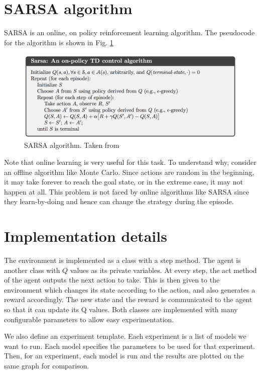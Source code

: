\documentclass{article}
\begin{document}
\section{SARSA algorithm} \label{sarsa_alg}

SARSA is an online, on policy reinforcement learning algorithm. The pseudocode for the algorithm is shown in Fig. \ref{fig:sarsa}

\begin{figure}[!h]
    \centering
    \includegraphics[width=\textwidth]{sarsa}
    \caption{SARSA algorithm. Taken from \cite{RLbook}}
    \label{fig:sarsa}
\end{figure}

Note that online learning is very useful for this task. To understand why, consider an offline algorithm like Monte Carlo. Since actions are random in the beginning, it may take forever to reach the goal state, or in the extreme case, it may not happen at all. This problem is not faced by online algorithms like SARSA since they learn-by-doing and hence can change the strategy during the episode.

\section{Implementation details} \label{impl}

The environment is implemented as a class with a step method. The agent is another class with $Q$ values as its private variables. At every step, the act method of the agent outputs the next action to take. This is then given to the environment which changes its state according to the action, and also generates a reward accordingly. The new state and the reward is communicated to the agent so that it can update its Q values. Both classes are implemented with many configurable parameters to allow easy experimentation.

We also define an experiment template. Each experiment is a list of models we want to run. Each model specifies the parameters to be used for that experiment. Then, for an experiment, each model is run and the results are plotted on the same graph for comparison.
\end{document}
